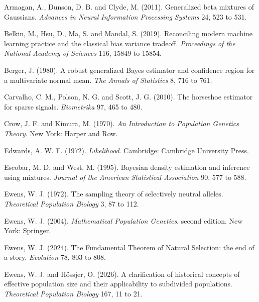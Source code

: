 \begin{thebibliography}{}

Armagan, A., Dunson, D. B. and Clyde, M. (2011). Generalized beta mixtures of Gaussians.
\emph{Advances in Neural Information Processing Systems} 24, 523 to 531.

Belkin, M., Hsu, D., Ma, S. and Mandal, S. (2019). Reconciling modern machine learning
practice and the classical bias variance tradeoff. \emph{Proceedings of the National Academy
of Sciences} 116, 15849 to 15854.

Berger, J. (1980). A robust generalized Bayes estimator and confidence region for a
multivariate normal mean. \emph{The Annals of Statistics} 8, 716 to 761.

Carvalho, C. M., Polson, N. G. and Scott, J. G. (2010). The horseshoe estimator for
sparse signals. \emph{Biometrika} 97, 465 to 480.

Crow, J. F. and Kimura, M. (1970). \emph{An Introduction to Population Genetics Theory}.
New York: Harper and Row.

Edwards, A. W. F. (1972). \emph{Likelihood}. Cambridge: Cambridge University Press.

Escobar, M. D. and West, M. (1995). Bayesian density estimation and inference using
mixtures. \emph{Journal of the American Statistical Association} 90, 577 to 588.

Ewens, W. J. (1972). The sampling theory of selectively neutral alleles.
\emph{Theoretical Population Biology} 3, 87 to 112.

Ewens, W. J. (2004). \emph{Mathematical Population Genetics}, second edition. New York:
Springer.

Ewens, W. J. (2024). The Fundamental Theorem of Natural Selection: the end of a story.
\emph{Evolution} 78, 803 to 808.

Ewens, W. J. and H\"ossjer, O. (2026). A clarification of historical concepts of effective
population size and their applicability to subdivided populations. \emph{Theoretical Population
Biology} 167, 11 to 21.


\end{thebibliography}
